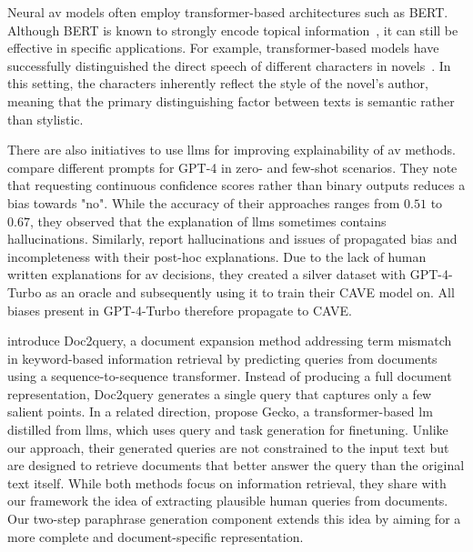 Neural \ac{av} models often employ transformer-based architectures such as BERT. 
Although BERT is known to strongly encode topical information~\citep{sawatphol_cross-topic_av_24}, it can still be effective in specific applications. 
For example, transformer-based models have successfully distinguished the direct speech of different characters in novels~\citep{michel_fictional_2024}. 
In this setting, the characters inherently reflect the style of the novel’s author, meaning that the primary distinguishing factor between texts is semantic rather than stylistic.

There are also initiatives to use \acp{llm} for improving explainability of \ac{av} methods.
\citet{hung_xai_av_llm_2023} compare different prompts for GPT-4 in zero- and few-shot scenarios.
They note that requesting continuous confidence scores rather than binary outputs reduces a bias towards "no".
While the accuracy of their approaches ranges from $0.51$ to $0.67$, they observed that the explanation of \acp{llm} sometimes contains hallucinations.
Similarly, \citet{ramnath_cave_xai_llm_2025} report hallucinations and issues of propagated bias and incompleteness with their post-hoc explanations.
Due to the lack of human written explanations for \ac{av} decisions, they created a silver dataset with GPT-4-Turbo as an oracle and subsequently using it to train their CAVE model on.
All biases present in GPT-4-Turbo therefore propagate to CAVE.

\citet{nogueira_doc2query_2019} introduce Doc2query, a document expansion method addressing term mismatch in keyword-based information retrieval by predicting queries from documents using a sequence-to-sequence transformer. 
Instead of producing a full document representation, Doc2query generates a single query that captures only a few salient points. 
In a related direction, \citet{lee_gecko_2024} propose Gecko, a transformer-based \ac{lm} distilled from \acp{llm}, which uses query and task generation for finetuning. 
Unlike our approach, their generated queries are not constrained to the input text but are designed to retrieve documents that better answer the query than the original text itself. 
While both methods focus on information retrieval, they share with our framework the idea of extracting plausible human queries from documents. 
Our two-step paraphrase generation component \pextractor{} extends this idea by aiming for a more complete and document-specific representation.

